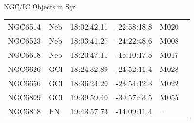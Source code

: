 \begin{block}{NGC/IC Objects in Sgr}
  \centering
  \begin{tabularx}{\textwidth}{llrrll} \toprule 
    NGC6514 & Neb & 18:02:42.11 & -22:58:18.8  & M020 \\ 
    NGC6523 & Neb & 18:03:41.27 & -24:22:48.6  & M008 \\ 
    NGC6618 & Neb & 18:20:47.11 & -16:10:17.5  & M017 \\ 
    NGC6626 & GCl & 18:24:32.89 & -24:52:11.4  & M028 \\ 
    NGC6656 & GCl & 18:36:24.20 & -23:54:12.3  & M022 \\ 
    NGC6809 & GCl & 19:39:59.40 & -30:57:43.5  & M055 \\ 
    NGC6818 & PN & 19:43:57.73 & -14:09:11.4  & -- \\ 
  \end{tabularx}
\end{block}